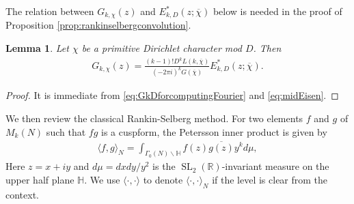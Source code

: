 \documentclass[11pt,letterpaper,reqno]{amsart}
\makeatletter
\numberwithin{figure}{section}
\numberwithin{table}{section}
\theoremstyle{definition}
\theoremstyle{plain}
\newtheorem{lemma}[theorem]{Lemma}
\theoremstyle{definition}
\theoremstyle{definition}
\theoremstyle{remark}
\numberwithin{equation}{section}
\theoremstyle{remark}
\DeclareMathOperator{\Sl}{SL}
\def\subsection{\@startsection{subsection}{2}%
  \z@{.5\linespacing\@plus.7\linespacing}{.3\linespacing}%
  {\normalfont\bfseries}}
\makeatother
\begin{document}
The relation between $G_{k,\chi}(z)$ and $E_{k,D}^{\ast}(z;\overline{\chi})$ below is needed in the proof of Proposition \ref{prop:rankinselbergconvolution}.
\begin{lemma}
    Let $\chi$  be a primitive Dirichlet character mod $D$. Then 
    \begin{align}
    G_{k,\chi}(z)=\frac{(k-1)!D^kL(k,\overline{\chi})}{(-2\pi i)^kG(\overline{\chi})}E^{\ast}_{k,D}(z;\overline{\chi}).\label{eq:EisensteinforR-S}
\end{align}
\end{lemma}
\begin{proof}
    It is immediate from  \eqref{eq:GkDforcomputingFourier} and \eqref{eq:midEisen}.
\end{proof}
We then review the classical Rankin-Selberg method. For two elements $f$ and $g$ of $M_k(N)$ such that $fg$ is a cuspform, the Petersson inner product is given by 
\begin{align}
    \langle f,g\rangle_{N}=\int_{\Gamma_{0}(N)\backslash\mathbb{H}}f(z)\overline{g(z)}y^kd\mu,\label{eq:defofPeterssoninnerproduct}
\end{align}
Here $z=x+iy$ and $d\mu=dxdy/y^2$ is the $\Sl_2(\mathbb{R})$-invariant measure on the upper half plane $\mathbb{H}$. We use $\langle\cdot,\cdot\rangle$ to denote $\langle\cdot,\cdot\rangle_{N}$ if the level is clear from the context. 
\end{document}
